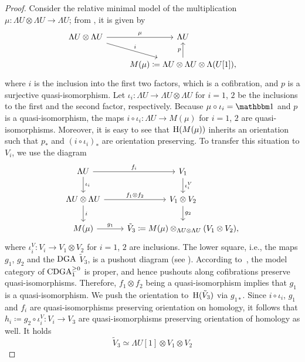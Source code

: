 \documentclass[\MainFolder/Text.tex]{subfiles}
\begin{document}
\begin{proof}
Consider the relative minimal model of the multiplication $\mu: \Lambda U \otimes \Lambda U \rightarrow \Lambda U$; from \cite[Example~2.48]{Felix2008}, it is given by
\begin{equation}\label{Eq:RelMinMod}
\begin{tikzcd}
\Lambda U \otimes \Lambda U\arrow{r}{\mu} \arrow{rd}{i} & \Lambda U \\
& M(\mu)\coloneqq \Lambda U \otimes \Lambda U \otimes \Lambda(U[1]), \arrow{u}{p}
\end{tikzcd}
\end{equation}
where $i$ is the inclusion into the first two factors, which is a cofibration, and $p$ is a surjective quasi-isomorphism. Let $\iota_i : \Lambda U \rightarrow \Lambda U \otimes \Lambda U$ for $i=1$, $2$ be the inclusions to the first and the second factor, respectively. Because $\mu \circ \iota_i = \Id$ and $p$ is a quasi-isomorphism, the maps $i \circ \iota_i : \Lambda U \rightarrow M(\mu)$ for $i=1$, $2$ are quasi-isomorphisms. Moreover, it is easy to see that $\mathrm{H}(M(\mu))$ inherits an orientation such that $p_*$ and $(i\circ \iota_i)_*$ are orientation preserving. To transfer this situation to $V_i$, we use the diagram
\begin{equation}\label{Eq:Pushout}
\begin{tikzcd}
\Lambda U \arrow{r}{f_i}\arrow{d}{\iota_i}& V_1 \arrow{d}{\iota_i^V} \\
\Lambda U \otimes \Lambda U \arrow{r}{f_1\otimes f_2} \arrow{d}{i} & V_1 \otimes V_2 \arrow{d}{g_2} \\
M(\mu) \arrow{r}{g_1} & \tilde{V}_3 \coloneqq  M(\mu) \otimes_{\Lambda U \otimes \Lambda U} (V_1\otimes V_2),
\end{tikzcd}
\end{equation}
where $\iota_i^V : V_i \rightarrow V_1 \otimes V_2$ for $i=1$, $2$ are inclusions. The lower square, i.e., the maps $g_1$, $g_2$ and the $\mathrm{DGA}$ $\tilde{V}_3$, is a pushout diagram (see \cite[Example~1.4]{LoopSpaces}). According to~\cite{NLabDGAmodel}, the model category of $\mathrm{CDGA}_{1}^{\ge 0}$ is proper, and hence pushouts along cofibrations preserve quasi-isomorphisms. Therefore, $f_1\otimes f_2$ being a quasi-isomorphism implies that $g_1$ is a quasi-isomorphism. We push the orientation to~$\mathrm{H}(\tilde{V}_3)$ via $g_{1*}$. Since $i\circ \iota_i$, $g_1$ and $f_i$ are quasi-isomorphisms preserving orientation on homology, it follows that $h_i\coloneqq g_2\circ \iota_i^V:  V_i \rightarrow V_3$ are quasi-isomorphisms preserving orientation of homology as well. It holds
$$ \tilde{V}_3 \simeq \Lambda U[1] \otimes V_1 \otimes V_2 $$

\end{proof}
\end{document}
